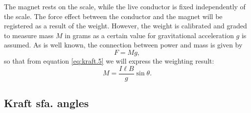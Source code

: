 \documentclass[../Elmag-labhefte-2020.tex]{subfiles}
\begin{document}
The magnet rests on the scale, while the live conductor is fixed independently of the scale. The force effect between the conductor and the magnet will be registered as a result of the weight. However, the weight is calibrated and graded to measure mass $M$ in grams as a certain value for gravitational acceleration $g$ is assumed. As is well known, the connection between power and mass is given by
\begin{equation}
    F = M g, 
    \label{eq:kraft.7}
\end{equation}
so that from equation \eqref{eq:kraft.5} we will express the weighting result:
\begin{equation}
    M = \frac{I \ell B}{g} \sin \theta.
    \label{eq:kraft.8}
\end{equation}






\subsection{Kraft sfa. angles \label{ch.kraft.beregn3}}
\end{document}
